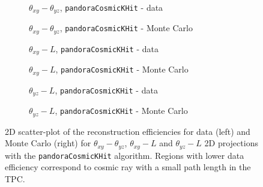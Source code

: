 \documentclass[a4paper]{scrartcl}
\begin{document}
\begin{figure}[htbp]
  \begin{subfigure}{0.52\textwidth}
    \caption{$\theta_{xy} - \theta_{yz}$, \texttt{pan\-do\-ra\-Co\-smicKHit} - data} \label{fig:2d_pk1}
  \end{subfigure}
  \begin{subfigure}{0.52\textwidth}
    \caption{$\theta_{xy} - \theta_{yz}$, \texttt{pan\-do\-ra\-Co\-smicKHit} - Monte Carlo}\label{fig:2d_pk1_mc}
  \end{subfigure}
  \begin{subfigure}{0.52\textwidth}
    \caption{$\theta_{xy} - L$, \texttt{pan\-do\-ra\-Co\-smicKHit} - data}\label{fig:2d_pk2}
  \end{subfigure}
  \begin{subfigure}{0.52\textwidth}
    \caption{$\theta_{xy} - L$, \texttt{pan\-do\-ra\-Co\-smicKHit} - Monte Carlo}\label{fig:2d_pk2_mc}
  \end{subfigure}
  \begin{subfigure}{0.52\textwidth}
    \caption{$\theta_{yz} - L$, \texttt{pan\-do\-ra\-Co\-smicKHit} - data}\label{fig:2d_pk3}
  \end{subfigure}
  \begin{subfigure}{0.52\textwidth}
    \caption{$\theta_{yz} - L$, \texttt{pan\-do\-ra\-Co\-smicKHit} - Monte Carlo}\label{fig:2d_pk3_mc}
  \end{subfigure}
  \caption{2D scatter-plot of the reconstruction efficiencies for data (left) and Monte Carlo (right) for $\theta_{xy} - \theta_{yz}$, $\theta_{xy} - L$ and $\theta_{yz} - L$ 2D projections with the \texttt{pandoraCosmicKHit} algorithm. Regions with lower data efficiency correspond to cosmic ray with a small path length in the TPC.} \label{fig:2deff_pandorak}
\end{figure}
\end{document}
